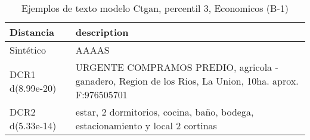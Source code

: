 \begin{table}[H]
\centering
\fontsize{10}{14}\selectfont
\caption{Ejemplos de texto modelo Ctgan, percentil 3, Economicos (B-1)}
\label{table-example-economicos-b-1-ctgan-3p-text}
\begin{tabular}{|l|m{35em}|}
\hline
\rowcolor[gray]{0.8}
Distancia & description \\
\hline Sintético & AAAAS \\
\hline DCR1 d(8.99e-20) & URGENTE COMPRAMOS PREDIO, agricola - ganadero, Region de los Rios, La Union, 10ha. aprox. F:976505701 \\
\hline DCR2 d(5.33e-14) & estar, 2 dormitorios, cocina, ba\~no, bodega, estacionamiento y local 2 cortinas \\
\hline
\end{tabular}
\end{table}
